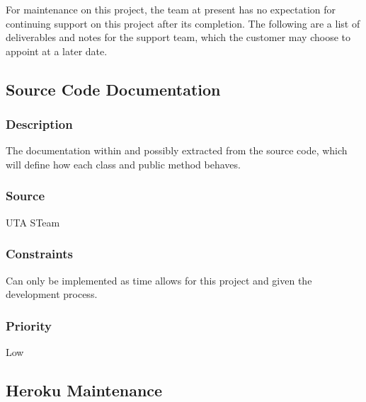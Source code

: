 For maintenance on this project, the team at present has no expectation for continuing support on this project after its completion.  The following are a list of deliverables and notes for the support team, which the customer may choose to appoint at a later date.

\subsection{Source Code Documentation}
\subsubsection{Description}
The documentation within and possibly extracted from the source code, which will define how each class and public method behaves.
\subsubsection{Source}
UTA STeam
\subsubsection{Constraints}
Can only be implemented as time allows for this project and given the development process.
\subsubsection{Priority}
Low

\subsection{Heroku Maintenance}
